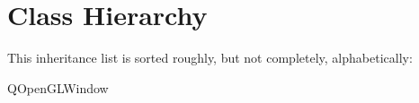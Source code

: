 \section{Class Hierarchy}
This inheritance list is sorted roughly, but not completely, alphabetically\+:\begin{DoxyCompactList}
\item {}
\item {}
\item Q\+Open\+G\+L\+Window\begin{DoxyCompactList}
\item {}
\end{DoxyCompactList}
\end{DoxyCompactList}
